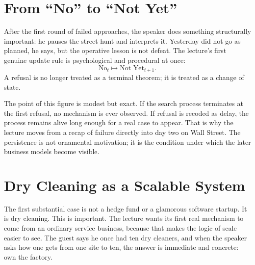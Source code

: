 \section{From ``No'' to ``Not Yet''}

After the first round of failed approaches, the speaker does something structurally important: he pauses the street hunt and interprets it. Yesterday did not go as planned, he says, but the operative lesson is not defeat. The lecture's first genuine update rule is psychological and procedural at once:
\begin{equation}
\text{No}_t \longmapsto \text{Not Yet}_{t+1}.
\end{equation}
A refusal is no longer treated as a terminal theorem; it is treated as a change of state.

\begin{figure}[h]
\centering
{}
\end{figure}

The point of this figure is modest but exact. If the search process terminates at the first refusal, no mechanism is ever observed. If refusal is recoded as delay, the process remains alive long enough for a real case to appear. That is why the lecture moves from a recap of failure directly into day two on Wall Street. The persistence is not ornamental motivation; it is the condition under which the later business models become visible.

\section{Dry Cleaning as a Scalable System}

The first substantial case is not a hedge fund or a glamorous software startup. It is dry cleaning. This is important. The lecture wants its first real mechanism to come from an ordinary service business, because that makes the logic of scale easier to see. The guest says he once had ten dry cleaners, and when the speaker asks how one gets from one site to ten, the answer is immediate and concrete: own the factory.

